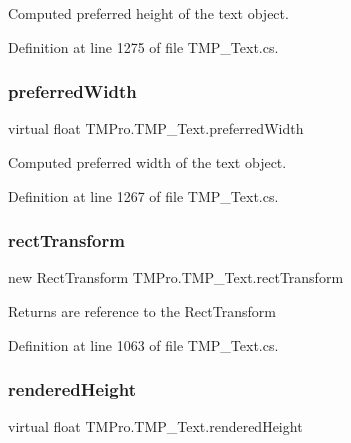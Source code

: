 Computed preferred height of the text object. 



Definition at line 1275 of file T\+M\+P\+\_\+\+Text.\+cs.

\mbox{\label{class_t_m_pro_1_1_t_m_p___text_a34ccac47d5d15bd04241a85773d6dc11}} 
\subsubsection{\texorpdfstring{preferredWidth}{preferredWidth}}
{\footnotesize\ttfamily virtual float T\+M\+Pro.\+T\+M\+P\+\_\+\+Text.\+preferred\+Width\hspace{0.3cm}{\ttfamily [get]}}



Computed preferred width of the text object. 



Definition at line 1267 of file T\+M\+P\+\_\+\+Text.\+cs.

\mbox{\label{class_t_m_pro_1_1_t_m_p___text_adf46752eab5ab6c5c0d0d7b58e3bf847}} 
\subsubsection{\texorpdfstring{rectTransform}{rectTransform}}
{\footnotesize\ttfamily new Rect\+Transform T\+M\+Pro.\+T\+M\+P\+\_\+\+Text.\+rect\+Transform\hspace{0.3cm}{\ttfamily [get]}}



Returns are reference to the Rect\+Transform 



Definition at line 1063 of file T\+M\+P\+\_\+\+Text.\+cs.

\mbox{\label{class_t_m_pro_1_1_t_m_p___text_a6471229b4d6df638b673ce4bd00a62ce}} 
\subsubsection{\texorpdfstring{renderedHeight}{renderedHeight}}
{\footnotesize\ttfamily virtual float T\+M\+Pro.\+T\+M\+P\+\_\+\+Text.\+rendered\+Height\hspace{0.3cm}{\ttfamily [get]}}



